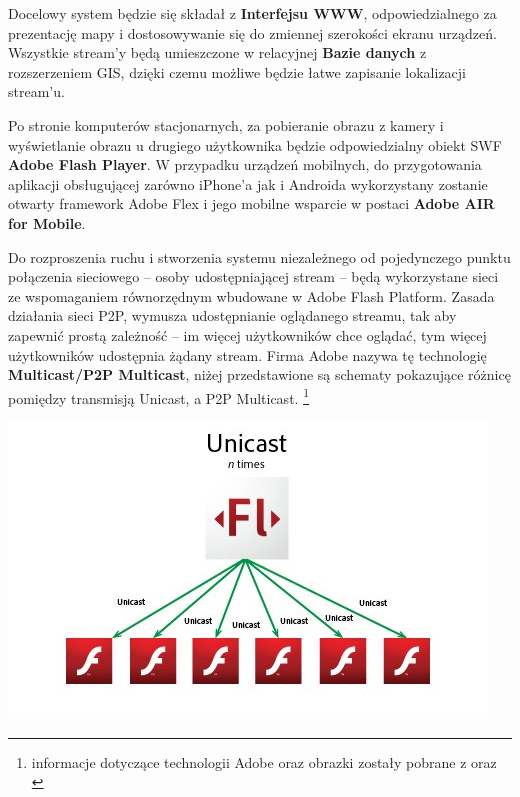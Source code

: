 Docelowy system będzie się składał z \textbf{Interfejsu WWW}, odpowiedzialnego za prezentację mapy i dostosowywanie się do zmiennej szerokości ekranu urządzeń. Wszystkie stream'y będą umieszczone w relacyjnej \textbf{Bazie danych} z rozszerzeniem GIS, dzięki czemu możliwe będzie łatwe zapisanie lokalizacji stream'u.

Po stronie komputerów stacjonarnych, za pobieranie obrazu z kamery i wyświetlanie obrazu u drugiego użytkownika będzie odpowiedzialny obiekt SWF \textbf{Adobe Flash Player}. W przypadku urządzeń mobilnych, do przygotowania aplikacji obsługującej zarówno iPhone'a jak i Androida wykorzystany zostanie otwarty framework Adobe Flex i jego mobilne wsparcie w postaci \textbf{Adobe AIR for Mobile}.

Do rozproszenia ruchu i stworzenia systemu niezależnego od pojedynczego punktu połączenia sieciowego -- osoby udostępniającej stream -- będą wykorzystane sieci ze wspomaganiem równorzędnym wbudowane w Adobe Flash Platform. Zasada działania sieci P2P, wymusza udostępnianie oglądanego streamu, tak aby zapewnić prostą zależność -- im więcej użytkowników chce oglądać, tym więcej użytkowników udostępnia żądany stream. Firma Adobe nazywa tę technologię \textbf{Multicast/P2P Multicast}, niżej przedstawione są schematy pokazujące różnicę pomiędzy transmisją Unicast, a P2P Multicast. \footnote{informacje dotyczące technologii Adobe oraz obrazki zostały pobrane z \cite{TomKrcha2010ME} oraz \cite{MattKauf2009}}

\begin{center}
    \includegraphics[width=\textwidth]{img/adobe-p2p-unicast.jpg}
\end{center}

